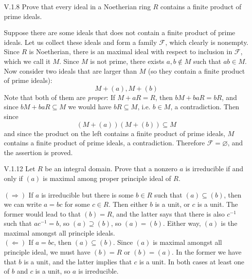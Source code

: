\begin{problem}{V.1.8}
Prove that every ideal in a Noetherian ring $R$ contains a finite product of prime ideals. 
\end{problem}
\begin{pf}
Suppose there are some ideals that does not contain a finite product of prime ideals. Let us collect these ideals and form a family $\mathscr{F}$, which clearly is nonempty. Since $R$ is Noetherian, there is an maximal ideal with respect to inclusion in $\mathscr{F}$, which we call it $M$. Since $M$ is not prime, there exists $a,b \notin M$ such that $ab \in M$. Now consider two ideals that are larger than $M$ (so they contain a finite product of prime ideals):
\[
M + (a), M + (b)
\]
Note that both of them are \emph{proper}: If $M+aR = R$, then $bM + baR = bR$, and since $bM + baR \subseteq M$ we would have $bR \subseteq M$, i.e. $b \in M$, a contradiction. Then since
\[
(M+(a))(M+(b)) \subseteq M
\]
and since the product on the left contains a finite product of prime ideals, $M$ contains a finite product of prime ideals, a contradiction. Therefore $\mathscr{F} = \varnothing$, and the assertion is proved.
\end{pf}

\begin{problem}{V.1.12}
Let $R$ be an integral domain. Prove that a nonzero $a$ is irreducible if and only if $(a)$ is maximal among proper principle ideal of $R$.
\end{problem}
\begin{pf}

\noindent $(\Rightarrow)$ If $a$ is irreducible but there is some $b \in R$ such that $(a) \subseteq (b)$, then we can write $a = bc$ for some $c \in R$. Then either $b$ is a unit, or $c$ is a unit. The former would lead to that $(b) = R$, and the latter says that there is also $c^{-1}$ such that $ac^{-1} = b$, so $(a)\supseteq (b)$, so $(a) = (b)$. Either way, $(a)$ is the maximal amongst all principle ideals. \\
$(\Leftarrow)$ If $a = bc$, then $(a) \subseteq (b)$. Since $(a)$ is maximal amongst all principle ideal, we must have $(b) = R$ or $(b) = (a)$. In the former we have that $b$ is a unit, and the latter implies that $c$ is a unit. In both cases at least one of $b$ and $c$ is a unit, so $a$ is irreducible. 
\end{pf}

